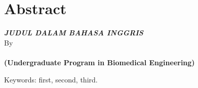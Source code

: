 \clearpage
\chapter*{Abstract}

\begin{center}
	\linespread{1}
	\large{\bfseries{
			\MakeUppercase{\textit{Judul dalam Bahasa Inggris}}
		}
	}\\[1\baselineskip]
	
	\normalsize{By\\}
	\large{ 
		\bfseries \theauthor\\
		(Undergraduate Program in Biomedical Engineering)
	}\\[2\baselineskip]
\end{center}

\medskip

\begin{spacing}{1.0}
	
	\itshape{
		\blindtext
		
		\blindtext
		
		Keywords: first, second, third.
	}
\end{spacing}

\clearpage
